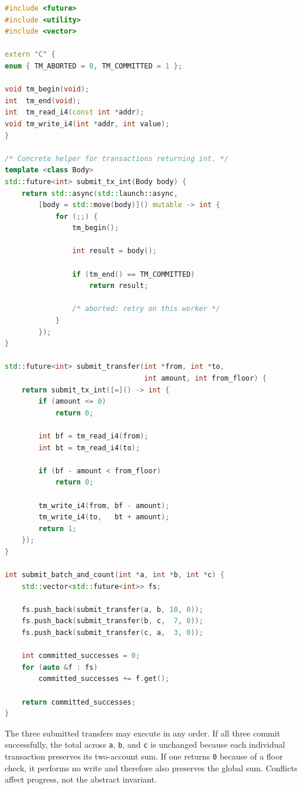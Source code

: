 \begin{lstlisting}[language=C++, caption={submitting bank transfers as transactional futures.}]
#include <future>
#include <utility>
#include <vector>

extern "C" {
enum { TM_ABORTED = 0, TM_COMMITTED = 1 };

void tm_begin(void);
int  tm_end(void);
int  tm_read_i4(const int *addr);
void tm_write_i4(int *addr, int value);
}

/* Concrete helper for transactions returning int. */
template <class Body>
std::future<int> submit_tx_int(Body body) {
    return std::async(std::launch::async,
        [body = std::move(body)]() mutable -> int {
            for (;;) {
                tm_begin();

                int result = body();

                if (tm_end() == TM_COMMITTED)
                    return result;

                /* aborted: retry on this worker */
            }
        });
}

std::future<int> submit_transfer(int *from, int *to,
                                 int amount, int from_floor) {
    return submit_tx_int([=]() -> int {
        if (amount <= 0)
            return 0;

        int bf = tm_read_i4(from);
        int bt = tm_read_i4(to);

        if (bf - amount < from_floor)
            return 0;

        tm_write_i4(from, bf - amount);
        tm_write_i4(to,   bt + amount);
        return 1;
    });
}

int submit_batch_and_count(int *a, int *b, int *c) {
    std::vector<std::future<int>> fs;

    fs.push_back(submit_transfer(a, b, 10, 0));
    fs.push_back(submit_transfer(b, c,  7, 0));
    fs.push_back(submit_transfer(c, a,  3, 0));

    int committed_successes = 0;
    for (auto &f : fs)
        committed_successes += f.get();

    return committed_successes;
}
\end{lstlisting}

The three submitted transfers may execute in any order. If all three commit successfully, the total across \texttt{a}, \texttt{b}, and \texttt{c} is unchanged because each individual transaction preserves its two-account sum. If one returns \texttt{0} because of a floor check, it performs no write and therefore also preserves the global sum. Conflicts affect progress, not the abstract invariant.

